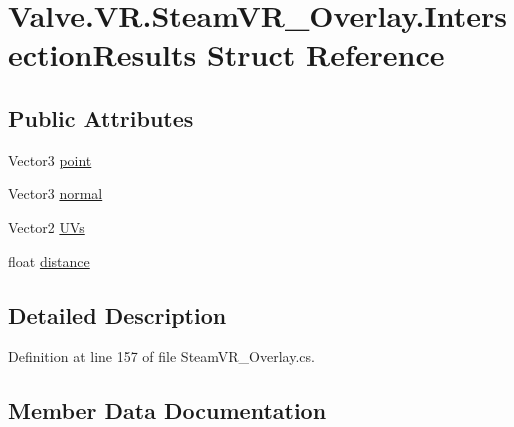 \hypertarget{struct_valve_1_1_v_r_1_1_steam_v_r___overlay_1_1_intersection_results}{}\section{Valve.\+V\+R.\+Steam\+V\+R\+\_\+\+Overlay.\+Intersection\+Results Struct Reference}
\label{struct_valve_1_1_v_r_1_1_steam_v_r___overlay_1_1_intersection_results}
\subsection*{Public Attributes}
\begin{DoxyCompactItemize}
\item 
Vector3 \mbox{\hyperlink{struct_valve_1_1_v_r_1_1_steam_v_r___overlay_1_1_intersection_results_a12e435d963fc924543c1f2862daa98bd}{point}}
\item 
Vector3 \mbox{\hyperlink{struct_valve_1_1_v_r_1_1_steam_v_r___overlay_1_1_intersection_results_a6a2bcd507dc180bb1e33c6d37f899595}{normal}}
\item 
Vector2 \mbox{\hyperlink{struct_valve_1_1_v_r_1_1_steam_v_r___overlay_1_1_intersection_results_a3f8b2c6691b5ef55f85d021db4cee11b}{U\+Vs}}
\item 
float \mbox{\hyperlink{struct_valve_1_1_v_r_1_1_steam_v_r___overlay_1_1_intersection_results_a621135f73d114ac0506a4906efe8ea9b}{distance}}
\end{DoxyCompactItemize}


\subsection{Detailed Description}


Definition at line 157 of file Steam\+V\+R\+\_\+\+Overlay.\+cs.



\subsection{Member Data Documentation}
\mbox{\label{struct_valve_1_1_v_r_1_1_steam_v_r___overlay_1_1_intersection_results_a621135f73d114ac0506a4906efe8ea9b}} 
